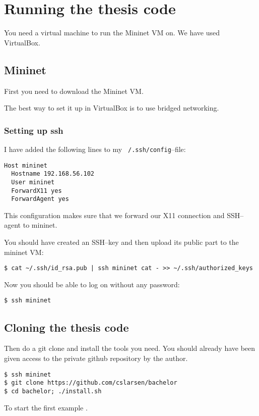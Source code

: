 \chapter{Running the thesis code}

You need a virtual machine to run the Mininet VM on.  We have used
VirtualBox.

\section{Mininet}

First you need to download the Mininet VM.

The best way to set it up in VirtualBox is to use bridged
networking.

\subsection{Setting up ssh}

I have added the following lines to my \texttt{~/.ssh/config}--file:

\begin{verbatim}
Host mininet
  Hostname 192.168.56.102
  User mininet
  ForwardX11 yes
  ForwardAgent yes
\end{verbatim}

This configuration makes sure that we forward our X11 connection and
SSH--agent to mininet.

You should have created an SSH--key and then upload its public part to the
mininet VM:

\begin{verbatim}
$ cat ~/.ssh/id_rsa.pub | ssh mininet cat - >> ~/.ssh/authorized_keys
\end{verbatim}

Now you should be able to log on without any password:

\begin{verbatim}
$ ssh mininet
\end{verbatim}

\section{Cloning the thesis code}

Then do a git clone and install the tools you need. You should already have
been given access to the private github repository by the author.

\begin{Verbatim}
$ ssh mininet
$ git clone https://github.com/cslarsen/bachelor
$ cd bachelor; ./install.sh
\end{Verbatim}

To start the first example .
